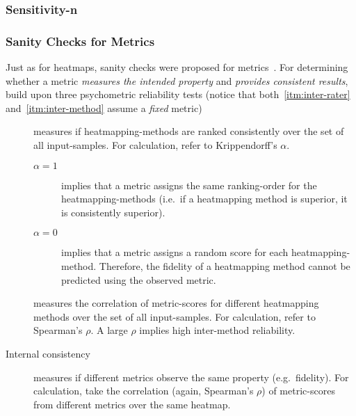 \subsubsection{Sensitivity-n}
\citeauthor{Ancona.}
\blindtext[1]

\subsubsection{Sanity Checks for Metrics}\label{metrics:sanity-checks}
Just as for heatmaps, sanity checks were proposed for metrics~\cite{Tomsett.2019}. For determining whether a metric \textit{measures the intended property} and \textit{provides consistent results}, \citeauthor{Tomsett.2019} build upon three psychometric reliability tests (notice that both~\ref{itm:inter-rater} and~\ref{itm:inter-method} assume a \textit{fixed} metric)
\begin{description}
    \item[] measures if heatmapping-methods are ranked consistently over the set of all input-samples.
    For calculation, \citeauthor{Tomsett.2019} refer to Krippendorff's \(\alpha\).
    \begin{description}
        \item[\(\alpha = 1\)] implies that a metric assigns the same ranking-order for the heatmapping-methods (i.e.\ if a heatmapping method is superior, it is consistently superior). 
        \item[\(\alpha = 0\)] implies that a metric assigns a random score for each heatmapping-method. Therefore, the fidelity of a heatmapping method cannot be predicted using the observed metric.
    \end{description} 
    \item[] measures the correlation of metric-scores for different heatmapping methods over the set of all input-samples. For calculation, \citeauthor{Tomsett.2019} refer to Spearman's \(\rho\). A large \(\rho\) implies high inter-method reliability.
    \item[Internal consistency] measures if different metrics observe the same property (e.g.\ fidelity). For calculation, \citeauthor{Tomsett.2019} take the correlation (again, Spearman's \(\rho\)) of metric-scores from different metrics over the same heatmap.
\end{description}

